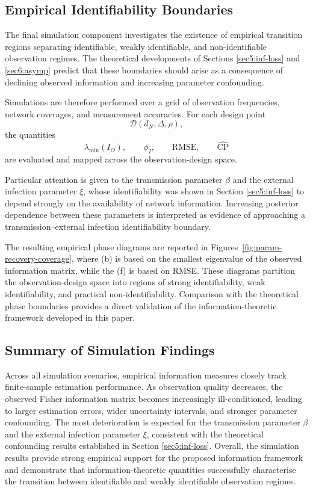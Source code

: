\documentclass[10pt]{article}
\begin{document}
\subsection{Empirical Identifiability Boundaries}
The final simulation component investigates the existence of empirical transition regions separating identifiable, weakly identifiable, and non-identifiable observation regimes. The theoretical developments of Sections \ref{sec5:inf-loss} and \ref{sec6:asymp} predict that these boundaries should arise as a consequence of declining observed information and increasing parameter confounding.

Simulations are therefore performed over a grid of observation frequencies, network coverages, and measurement accuracies. For each design point
\[
\mathcal{D}(d_N,\Delta,\rho),
\]
the quantities
\[
\lambda_{\min}(I_O), \qquad \phi_I, \qquad \mathrm{RMSE}, \qquad \widehat{\mathrm{CP}}
\]
are evaluated and mapped across the observation-design space.

Particular attention is given to the transmission parameter $\beta$ and the external infection parameter $\xi$, whose identifiability was shown in Section \ref{sec5:inf-loss} to depend strongly on the availability of network information. Increasing posterior dependence between these parameters is interpreted as evidence of approaching a transmission--external infection identifiability boundary.

The resulting empirical phase diagrams are reported in Figures~\ref{fig:param-recovery-coverage}, where (b) is based on the smallest eigenvalue of the observed information matrix, while the (f) is based on RMSE. These diagrams partition the observation-design space into regions of strong identifiability, weak identifiability, and practical non-identifiability. Comparison with the theoretical phase boundaries provides a direct validation of the information-theoretic framework developed in this paper.

\subsection{Summary of Simulation Findings}
Across all simulation scenarios, empirical information measures closely track finite-sample estimation performance. As observation quality decreases, the observed Fisher information matrix becomes increasingly ill-conditioned, leading to larger estimation errors, wider uncertainty intervals, and stronger parameter confounding. The most deterioration is expected for the transmission parameter $\beta$ and the external infection parameter $\xi$, consistent with the theoretical confounding results established in Section \ref{sec5:inf-loss}. Overall, the simulation results provide strong empirical support for the proposed information framework and demonstrate that information-theoretic quantities successfully characterise the transition between identifiable and weakly identifiable observation regimes.
\end{document}
